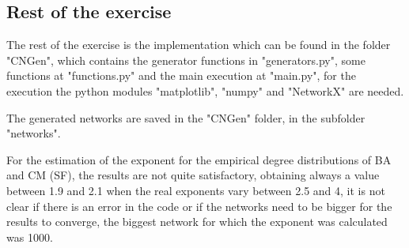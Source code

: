 \documentclass[12pt,a4paper,oneside]{article}
\numberwithin{equation}{section}
\numberwithin{equation}{section}
\theoremstyle{definition}
\begin{document}
\subsection{Rest of the exercise}

The rest of the exercise is the implementation which can be found in the folder "CNGen", which contains the generator functions in "generators.py", some functions at "functions.py" and the main execution at "main.py", for the execution the python modules "matplotlib", "numpy" and "NetworkX" are needed.

The generated networks are saved in the "CNGen" folder, in the subfolder "networks".

For the estimation of the exponent for the empirical degree distributions of BA and CM (SF), the results are not quite satisfactory, obtaining always a value between 1.9 and 2.1 when the real exponents vary between 2.5 and 4, it is not clear if there is an error in the code or if the networks need to be bigger for the results to converge, the biggest network for which the exponent was calculated was 1000. 
\end{document}

